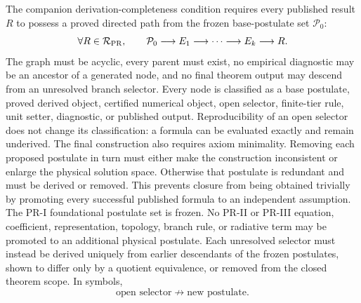 The companion derivation-completeness condition requires every published
result $R$ to possess a proved directed path from the frozen base-postulate
set \(\mathcal P_0\):
\begin{equation}
\forall R\in\mathcal R_{\rm PR},
\qquad
\mathcal P_0
\longrightarrow E_1\longrightarrow\cdots\longrightarrow E_k
\longrightarrow R.
\label{eq:pr35-derivation-path}
\end{equation}
The graph must be acyclic, every parent must exist, no empirical diagnostic may be an ancestor of a generated node, and no final theorem output may descend from an unresolved branch selector. Every node is classified as a base postulate, proved derived object, certified numerical object, open selector, finite-tier rule, unit setter, diagnostic, or published output.  Reproducibility of an open selector does not change its classification: a formula can be evaluated exactly and remain underived. The final construction also requires axiom minimality.  Removing each proposed postulate in turn must either make the construction inconsistent or enlarge the physical solution space.  Otherwise that postulate is redundant and must be derived or removed.  This prevents closure from being obtained trivially by promoting every successful published formula to an independent assumption. The PR-I foundational postulate set is frozen. No PR-II or PR-III equation, coefficient, representation, topology, branch rule, or radiative term may be promoted to an additional physical postulate.  Each unresolved selector must instead be derived uniquely from earlier descendants of the frozen postulates, shown to differ only by a quotient equivalence, or removed from the closed theorem scope.  In symbols,
\begin{equation}
\boxed{
\text{open selector}
\not\longrightarrow
\text{new postulate}.}
\label{eq:pr35-no-new-postulate-rule}
\end{equation}
